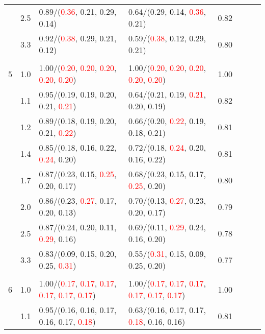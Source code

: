 \documentclass[10pt,a4paper]{report}
\begin{document}
\begin{table}[!htbp]
\begin{center}
{\begin{tabular}{ccllcccc}
			&2.5&0.89/(\textcolor{red}{0.36}, 0.21, 0.29, \textcolor{black}{0.14})&0.64/(0.29, \textcolor{black}{0.14}, \textcolor{red}{0.36}, 0.21)&0.82\\
			&3.3&0.92/(\textcolor{red}{0.38}, 0.29, 0.21, \textcolor{black}{0.12})&0.59/(\textcolor{red}{0.38}, \textcolor{black}{0.12}, 0.29, 0.21)&0.80\\
			&&&&\\
			5			&1.0&1.00/(\textcolor{red}{0.20}, \textcolor{red}{0.20}, \textcolor{red}{0.20}, \textcolor{red}{0.20}, \textcolor{red}{0.20})&1.00/(\textcolor{red}{0.20}, \textcolor{red}{0.20}, \textcolor{red}{0.20}, \textcolor{red}{0.20}, \textcolor{red}{0.20})&1.00\\
			&1.1&0.95/(\textcolor{black}{0.19}, 0.19, 0.20, 0.21, \textcolor{red}{0.21})&0.64/(0.21, 0.19, \textcolor{red}{0.21}, 0.20, \textcolor{black}{0.19})&0.82\\
			&1.2&0.89/(\textcolor{black}{0.18}, 0.19, 0.20, 0.21, \textcolor{red}{0.22})&0.66/(0.20, \textcolor{red}{0.22}, 0.19, \textcolor{black}{0.18}, 0.21)&0.81\\
			&1.4&0.85/(0.18, \textcolor{black}{0.16}, 0.22, \textcolor{red}{0.24}, 0.20)&0.72/(0.18, \textcolor{red}{0.24}, 0.20, \textcolor{black}{0.16}, 0.22)&0.81\\
			&1.7&0.87/(0.23, \textcolor{black}{0.15}, \textcolor{red}{0.25}, 0.20, 0.17)&0.68/(0.23, \textcolor{black}{0.15}, 0.17, \textcolor{red}{0.25}, 0.20)&0.80\\
			&2.0&0.86/(0.23, \textcolor{red}{0.27}, 0.17, 0.20, \textcolor{black}{0.13})&0.70/(\textcolor{black}{0.13}, \textcolor{red}{0.27}, 0.23, 0.20, 0.17)&0.79\\
			&2.5&0.87/(0.24, 0.20, \textcolor{black}{0.11}, \textcolor{red}{0.29}, 0.16)&0.69/(\textcolor{black}{0.11}, \textcolor{red}{0.29}, 0.24, 0.16, 0.20)&0.78\\
			&3.3&0.83/(\textcolor{black}{0.09}, 0.15, 0.20, 0.25, \textcolor{red}{0.31})&0.55/(\textcolor{red}{0.31}, 0.15, \textcolor{black}{0.09}, 0.25, 0.20)&0.77\\
			&&&&\\
			6			&1.0&1.00/(\textcolor{red}{0.17}, \textcolor{red}{0.17}, \textcolor{red}{0.17}, \textcolor{red}{0.17}, \textcolor{red}{0.17}, \textcolor{red}{0.17})&1.00/(\textcolor{red}{0.17}, \textcolor{red}{0.17}, \textcolor{red}{0.17}, \textcolor{red}{0.17}, \textcolor{red}{0.17}, \textcolor{red}{0.17})&1.00\\
			&1.1&0.95/(\textcolor{black}{0.16}, 0.16, 0.17, 0.16, 0.17, \textcolor{red}{0.18})&0.63/(\textcolor{black}{0.16}, 0.17, 0.17, \textcolor{red}{0.18}, 0.16, 0.16)&0.81\\

\end{tabular}}
\end{center}
\end{table}
\end{document}
